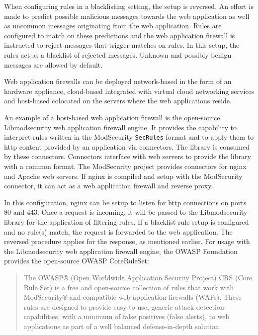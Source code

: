 When configuring rules in a blacklisting setting, the setup is reversed. 
An effort is made to predict possible malicious messages towards the web application as well as uncommon messages originating from the web application.
Rules are configured to match on these predictions and the web application firewall is instructed to reject messages that trigger matches on rules. 
In this setup, the rules act as a blacklist of rejected messages. Unknown and possibly benign messages are allowed by default.

Web application firewalls can be deployed network-based in the form of an hardware appliance, cloud-based integrated with virtual cloud networking services and host-based colocated on the servers where the web applications reside. \cite{palo/waf}

An example of a host-based web application firewall is the open-source Libmodsecurity web application firewall engine.
It provides the capability to interpret rules written in the ModSecurity \verb|SecRules| format and to apply them to \acrshort{http} content provided by an application via connectors.
The library is consumed by these connectors. Connectors interface with web servers to provide the library with a common format.
The ModSecurity project provides connectors for nginx and Apache web servers.
If nginx is compiled and setup with the ModSecurity connector, it can act as a web application firewall and reverse proxy. \cite{modsec/home, modsec/nginx}

In this configuration, nginx can be setup to listen for \acrshort{http} connections on ports 80 and 443.
Once a request is incoming, it will be passed to the Libmodsecurity library for the application of filtering rules.
If a blacklist rule setup is configured and no rule(s) match, the request is forwarded to the web application. The reversed procedure applies for the response, as mentioned earlier.
For usage with the Libmodsecurity web application firewall engine, the OWASP Foundation provides the open-source OWASP CoreRuleSet:

\begin{quote}
	The OWASP® (Open Worldwide Application Security Project) CRS (Core Rule Set) is a free and open-source collection of rules that work with ModSecurity® and compatible web application firewalls (WAFs). These rules are designed to provide easy to use, generic attack detection capabilities, with a minimum of false positives (false alerts), to web applications as part of a well balanced defense-in-depth solution. \cite{OWASP/crshome}
\end{quote}

